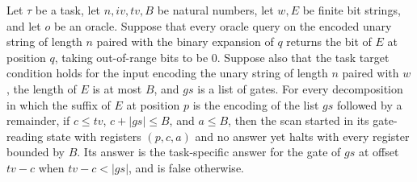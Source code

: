 \begin{lemma}
\label{BoolCircuit.AdjScan.gloop}
\leanok
{}
Let $\tau$ be a task, let $n,iv,tv,B$ be natural numbers, let $w,E$ be finite bit
strings, and let $o$ be an oracle. Suppose that every oracle query on the encoded unary
string of length $n$ paired with the binary expansion of $q$ returns the bit of $E$ at
position $q$, taking out-of-range bits to be $0$. Suppose also that the task target
condition holds for the input encoding the unary string of length $n$ paired with $w$,
the length of $E$ is at most $B$, and $gs$ is a list of gates. For every decomposition
in which the suffix of $E$ at position $p$ is the encoding of the list $gs$ followed by
a remainder, if $c\le tv$, $c+|gs|\le B$, and $a\le B$, then the scan started in its
gate-reading state with registers $(p,c,a)$ and no answer yet halts with every register
bounded by $B$. Its answer is the task-specific answer for the gate of $gs$ at offset
$tv-c$ when $tv-c<|gs|$, and is false otherwise.
\end{lemma}

